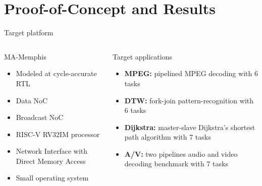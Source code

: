 \section{Proof-of-Concept and Results}

\begin{frame}{Target platform}
    \begin{columns}
        \begin{block}{MA-Memphis \cite{Dalzotto:2021:MA-Memphis}}
            \begin{itemize}
                \item Modeled at cycle-accurate RTL
                \item Data NoC
                \item Broadcast NoC
                \item RISC-V RV32IM processor
                \item Network Interface with Direct Memory Access
                \item Small operating system
            \end{itemize}
        \end{block}

        \begin{block}{Target applications}
            \begin{itemize}
                \item \textbf{MPEG:} pipelined MPEG decoding with 6 tasks
                \item \textbf{DTW:} fork-join pattern-recognition with 6 tasks
                \item \textbf{Dijkstra:} master-slave Dijkstra's shortest path algorithm with 7 tasks
                \item \textbf{A/V:} two pipelines audio and video decoding benchmark with 7 tasks
            \end{itemize}
        \end{block}
    \end{columns}    
\end{frame}

